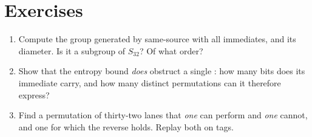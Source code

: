 \section{Exercises}

\begin{enumerate}
\item Compute the group generated by same-source  with all immediates, and its diameter. Is it a subgroup of \(S_{32}\)? Of what order?
\item Show that the entropy bound \emph{does} obstruct a single : how many bits does its immediate carry, and how many distinct permutations can it therefore express?
\item Find a permutation of thirty-two lanes that \emph{one}  can perform and \emph{one}  cannot, and one for which the reverse holds. Replay both on tags.
\end{enumerate}
